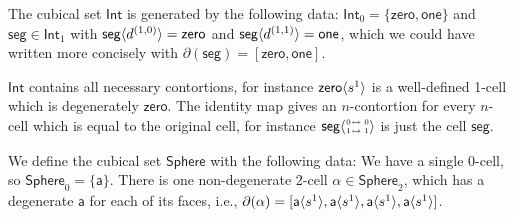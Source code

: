 \documentclass{llncs}
\newcommand{\mdef}{:=}
\newcommand{\mlist}[1]{[ {#1} ]}
\newcommand{\smap}[1]{s^{{#1}}}
\newcommand{\dmap}[2]{d^{({#1} , {#2})}}
\newcommand{\cont}[2]{\ensuremath{ \ifthenelse{\equal{#2}{}}{#1}{{#1}\langle{#2}\rangle}} }
\newcommand{\cset}[1]{\ensuremath{\mathsf{{#1}}}}
\newcommand{\boundary}[1]{\partial({#1})}
\newcommand{\comp}[2]{\mathsf{Comp}({#1}\ {#2})}
\newcommand{\substtwo}[2]{\tiny
  \arraycolsep=.4pt\def\arraystretch{1}
  \begin{array}{ll}
    0 &\mapsto {#1} \\
    1 &\mapsto {#2}
  \end{array}
}
\newcommand{\oneid}{\substtwo{0}{1}}
\begin{document}





\begin{example}\label{exp:int}
  The cubical set $\cset{Int}$ is generated by the following data: $\cset{Int}_0
  = \{ \cset{zero} , \cset{one} \}$ and $\cset{seg} \in \cset{Int}_1$ with
  $\cont{\cset{seg}}{\dmap{1}{0}} = \cset{zero}$ and $\cont{\cset{seg}}{\dmap{1}{1}} =
  \cset{one}$, which we could have written more concisely with
  $\boundary{\cset{seg}} = \mlist{\cset{zero}, \cset{one}}$.

  $\cset{Int}$ contains all necessary contortions, for instance
  $\cont{\cset{zero}}{\smap{1}}$ is a well-defined 1-cell which is
  degenerately $\cset{zero}$.
  The identity map gives an $n$-contortion for every $n$-cell which is equal
  to the original cell, for instance $\cont{\cset{seg}}{\oneid}$ is just the cell
  $\cset{seg}$.


\end{example}

\begin{example}\label{exp:sndsphere}
  We define the cubical set $\cset{Sphere}$ with the following data: We have a
  single 0-cell, so $\cset{Sphere}_0 = \{
  \cset{a} \}$. There is one non-degenerate 2-cell $\cset{\alpha} \in
  \cset{Sphere}_2$, which has a degenerate $\cset{a}$ for each of its faces,
  i.e.,
  $\boundary{\cset{\alpha}} = \mlist{ \cont{\cset{a}}{\smap{1}},
    \cont{\cset{a}}{\smap{1}}, \cont{\cset{a}}{\smap{1}}, \cont{\cset{a}}{\smap{1}} }$.
\end{example}
\end{document}
